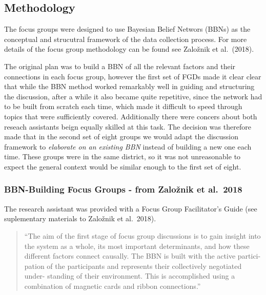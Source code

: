 \documentclass[]{article}
\begin{document}
\hypertarget{methodology}{%
\subsection{Methodology}\label{methodology}}

The focus groups were designed to use Bayesian Belief Networs (BBNs) as
the conceptual and strucutral framework of the data collection process.
For more details of the focus group methodology can be found see
Založnik et al.~(2018).

The original plan was to build a BBN of all the relevant factors and
their connections in each focus group, however the first set of FGDs
made it clear clear that while the BBN method worked remarkably well in
guiding and structuring the discussion, after a while it also became
quite repetitive, since the network had to be built from scratch each
time, which made it difficult to speed through topics that were
sufficiently covered. Additionally there were concers about both reseach
assistants beign equally skilled at this task. The decision was
therefore made that in the second set of eight groups we would adapt the
discussion framework to \emph{elaborate on an existing BBN} instead of
building a new one each time. These groups were in the same district, so
it was not unreasonable to expect the general context would be similar
enough to the first set of eight.

\hypertarget{bbn-building-focus-groups---from-zaloznik-et-al.-2018}{%
\subsubsection{BBN-Building Focus Groups - from Založnik et
al.~2018}\label{bbn-building-focus-groups---from-zaloznik-et-al.-2018}}

The research assistant was provided with a Focus Group Facilitator's
Guide (see suplementary materials to Založnik et al.~2018).

\begin{quote}
``The aim of the first stage of focus group discussions is to gain
insight into the system as a whole, its most important determinants, and
how these different factors connect causally. The BBN is built with the
active partici- pation of the participants and represents their
collectively negotiated under- standing of their environment. This is
accomplished using a combination of magnetic cards and ribbon
connections.''
\end{quote}
\end{document}
